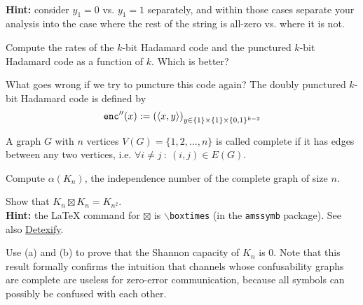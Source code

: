 \documentclass[a4paper,10pt,landscape,twocolumn]{scrartcl}
\begin{document}
\begin{exercise}
\begin{subex}[(3pt)]
	\\\textbf{Hint:} consider $y_1 = 0$ vs. $y_1 = 1$ separately, and within those cases separate your analysis into the case where the rest of the string is all-zero vs. where it is not.
	\end{subex}
	\begin{subex}[(2pt)]
	Compute the rates of the $k$-bit Hadamard code and the punctured $k$-bit Hadamard code as a function of $k$. Which is better?
	\end{subex}
	\begin{subex}[(1pt)]
	What goes wrong if we try to puncture this code again? The doubly punctured $k$-bit Hadamard code is defined by
	\[
	\mathtt{enc}''(x) := \left(\langle x, y\rangle\right)_{y \in \{1\} \times \{1\} \times \{0,1\}^{k-2}}
	\]
	\end{subex}
\end{exercise}

\begin{exercise}
A graph $G$ with $n$ vertices $V(G) = \{1,2,...,n\}$ is called complete if it has edges between any two vertices, i.e. $\forall i \neq j \ : \ (i,j) \in E(G)$.
	\begin{subex}[(2pt)]
	Compute $\alpha(K_n)$, the independence number of the complete graph of size $n$.
	\end{subex}
	\begin{subex}[(2pt)]
	Show that $K_n \boxtimes K_n = K_{n^2}$.
	\\\textbf{Hint:} the \LaTeX{} command for $\boxtimes$ is \texttt{$\backslash$boxtimes} (in the \texttt{amssymb} package). See also \href{http://detexify.kirelabs.org/classify.html}{Detexify}.
	\end{subex}
	\begin{subex}[(2pt)]
	Use (a) and (b) to prove that the Shannon capacity of $K_n$ is 0. Note that this result formally confirms the intuition that channels whose confusability graphs are complete are useless for zero-error communication, because all symbols can possibly be confused with each other.
	\end{subex}
\end{exercise}
\end{document}
